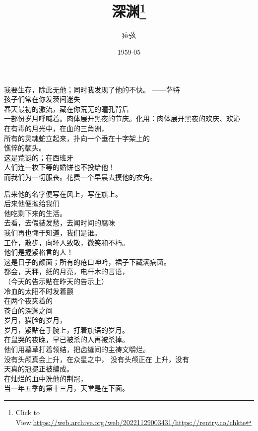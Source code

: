 \documentclass{article}
\title{深渊\footnote{Click to View:\url{https://web.archive.org/web/20221129003431/https://rentry.co/chkte}}}
\author{痖弦}
\date{1959-05}
\begin{document}

\maketitle

\setlength\parindent{0pt}


\Large

﻿我要生存，除此无他；同时我发现了他的不快。
——萨特 \\ 


孩子们常在你发茨间迷失\\
春天最初的激流，藏在你荒芜的瞳孔背后\\
一部份岁月呼喊着。肉体展开黑夜的节庆。化用：肉体展开黑夜的欢庆、欢沁\\
在有毒的月光中，在血的三角洲，\\
所有的灵魂蛇立起来，扑向一个垂在十字架上的
\\
憔悴的额头。 \\ 


这是荒诞的；在西班牙\\
人们连一枚下等的婚饼也不投给他！\\
而我们为一切服丧。花费一个早晨去摸他的衣角。\\
\newpage

后来他的名字便写在风上，写在旗上。\\
后来他便抛给我们
\\
他吃剩下来的生活。 \\ 


去看，去假装发愁，去闻时间的腐味\\
我们再也懒于知道，我们是谁。\\
工作，散步，向坏人致敬，微笑和不朽。\\
他们是握紧格言的人！\\
这是日子的颜面；所有的疮口呻吟，裙子下藏满病菌。\\
都会，天秤，纸的月亮，电杆木的言语，\\
（今天的告示贴在昨天的告示上）\\
冷血的太阳不时发着颤\\
在两个夜夹着的
\\
苍白的深渊之间 \\ 


岁月，猫脸的岁月，\\
岁月，紧贴在手腕上，打着旗语的岁月。\\
在鼠哭的夜晚，早已被杀的人再被杀掉。\\
他们用墓草打着领结，把齿缝间的主祷文嚼烂。\\
没有头颅真会上升，在众星之中， 没有头颅正在
\newpage
上升，没有\\
天真的冠冕正被编成。\\
在灿烂的血中洗他的荆冠，
\\
当一年五季的第十三月，天堂是在下面。 \\ 
\end{document}
